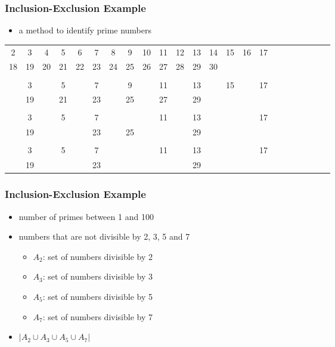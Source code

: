 \documentclass[dvipsnames]{beamer}
\begin{document}
\begin{frame}
  \frametitle{Inclusion-Exclusion Example}

  \begin{example}
    \begin{itemize}
      \item a method to identify prime numbers
    \end{itemize}

    \pause
    \begin{tiny}
    \begin{tabular}{ccccccccccccccccccccccc}
  2 &  3 &  4 &  5 &  6 &  7 &  8 &  9 & 10 & 11 & 12 & 13 & 14 & 15 & 16 & 17\\
 18 & 19 & 20 & 21 & 22 & 23 & 24 & 25 & 26 & 27 & 28 & 29 & 30\\
\\ \pause
  2 &  3 &    &  5 &    &  7 &    &  9 &    & 11 &    & 13 &    & 15 &    & 17\\
    & 19 &    & 21 &    & 23 &    & 25 &    & 27 &    & 29 & \\
\\  \pause
  2 &  3 &    &  5 &    &  7 &    &    &    & 11 &    & 13 &    &    &    & 17\\
    & 19 &    &    &    & 23 &    & 25 &    &    &    & 29 & \\
\\  \pause
  2 &  3 &    &  5 &    &  7 &    &    &    & 11 &    & 13 &    &    &    & 17\\
    & 19 &    &    &    & 23 &    &    &    &    &    & 29 & \\
    \end{tabular}
    \end{tiny}
  \end{example}
\end{frame}

\begin{frame}
  \frametitle{Inclusion-Exclusion Example}

  \begin{example}
    \begin{itemize}
      \item number of primes between 1 and 100
      \medskip

      \pause
      \item numbers that are not divisible by 2, 3, 5 and 7
      \begin{itemize}
        \item $A_2$: set of numbers divisible by 2
        \item $A_3$: set of numbers divisible by 3
        \item $A_5$: set of numbers divisible by 5
        \item $A_7$: set of numbers divisible by 7
      \end{itemize}

      \pause
      \item $|A_2 \cup A_3 \cup A_5 \cup A_7|$
    \end{itemize}
  \end{example}
\end{frame}
\end{document}
